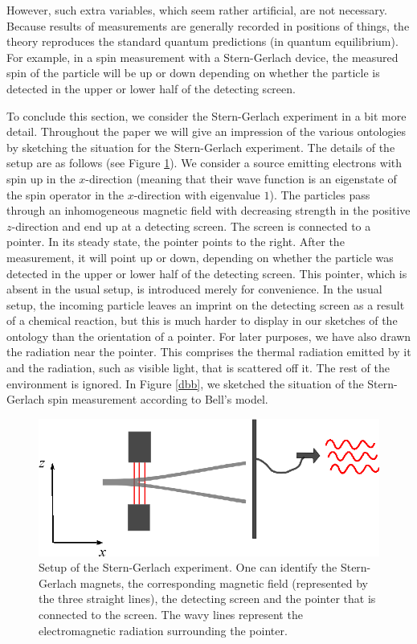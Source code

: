 \documentclass[11pt]{article}
\begin{document}
However, such extra variables, which seem rather artificial, are not necessary. Because results of measurements are generally recorded in positions of things, the theory reproduces the standard quantum predictions (in quantum equilibrium). For example, in a spin measurement with a Stern-Gerlach device, the measured spin of the particle will be up or down depending on whether the particle is detected in the upper or lower half of the detecting screen.

To conclude this section, we consider the Stern-Gerlach experiment in a bit more detail. Throughout the paper we will give an impression of the various ontologies by sketching the situation for the Stern-Gerlach experiment. The details of the setup are as follows (see Figure \ref{sterngerlach}). We consider a source emitting electrons with spin up in the $x$-direction (meaning that their wave function is an eigenstate of the spin operator in the $x$-direction with eigenvalue $1$). The particles pass through an inhomogeneous magnetic field with decreasing strength in the positive $z$-direction and end up at a detecting screen. The screen is connected to a pointer. In its steady state, the pointer points to the right. After the measurement, it will point up or down, depending on whether the particle was detected in the upper or lower half of the detecting screen. This pointer, which is absent in the usual setup, is introduced merely for convenience. In the usual setup, the incoming particle leaves an imprint on the detecting screen as a result of a chemical reaction, but this is much harder to display in our sketches of the ontology than the orientation of a pointer. For later purposes, we have also drawn the radiation near the pointer. This comprises the thermal radiation emitted by it and the radiation, such as visible light, that is scattered off it. The rest of the environment is ignored. In Figure \ref{dbb}, we sketched the situation of the Stern-Gerlach spin measurement according to Bell's model.

 
\begin{figure}
\begin{center}
\includegraphics{sterngerlach.eps}
\end{center}
\caption{\label{sterngerlach}Setup of the Stern-Gerlach experiment. One can identify the Stern-Gerlach magnets, the corresponding magnetic field (represented by the three straight lines), the detecting screen and the pointer that is connected to the screen. The wavy lines represent the electromagnetic radiation surrounding the pointer.}
\end{figure} 
\end{document}
